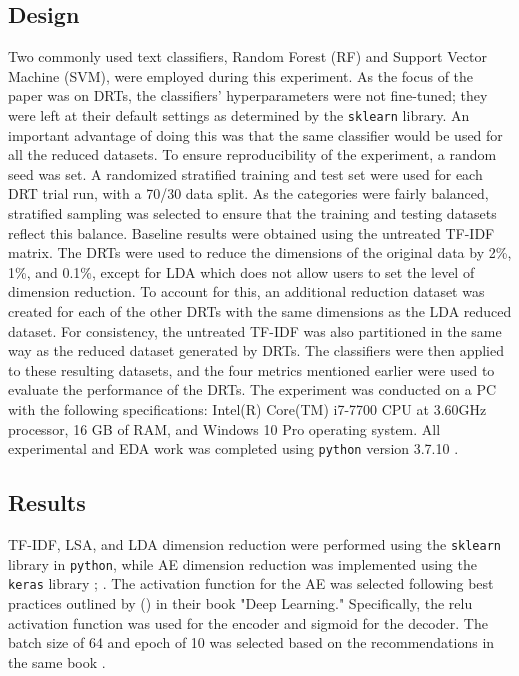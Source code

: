 \documentclass[12pt]{article}
\begin{document}
\subsection{Design}
\hspace{\parindent} Two commonly used text classifiers, Random Forest (RF) and Support Vector Machine (SVM), were employed during this experiment. As the focus of the paper was on DRTs, the classifiers' hyperparameters were not fine-tuned; they were left at their default settings as determined by the \texttt{sklearn} library. An important advantage of doing this was that the same classifier would be used for all the reduced datasets. To ensure reproducibility of the experiment, a random seed was set. A randomized stratified training and test set were used for each DRT trial run, with a 70/30 data split. As the categories were fairly balanced, stratified sampling was selected to ensure that the training and testing datasets reflect this balance. Baseline results were obtained using the untreated TF-IDF matrix. The DRTs were used to reduce the dimensions of the original data by 2\%, 1\%, and 0.1\%, except for LDA which does not allow users to set the level of dimension reduction. To account for this, an additional reduction dataset was created for each of the other DRTs with the same dimensions as the LDA reduced dataset. For consistency, the untreated TF-IDF was also partitioned in the same way as the reduced dataset generated by DRTs. The classifiers were then applied to these resulting datasets, and the four metrics mentioned earlier were used to evaluate the performance of the DRTs. The experiment was conducted on a PC with the following specifications: Intel(R) Core(TM) i7-7700 CPU at 3.60GHz processor, 16 GB of RAM, and Windows 10 Pro operating system. All experimental and EDA work was completed using \texttt{python} version 3.7.10 \parencite{10.5555/1593511}.

\subsection{Results}
\hspace{\parindent} TF-IDF, LSA, and LDA dimension reduction were performed using the \texttt{sklearn} library in \texttt{python}, while AE dimension reduction was implemented using the \texttt{keras} library \parencite{pedregosa2011scikit}; \parencite{chollet2015keras}. The activation function for the AE was selected following best practices outlined by \citeauthor{goodfellow_bengio_courville_2017} (\citeyear{goodfellow_bengio_courville_2017}) in their book "Deep Learning." Specifically, the relu activation function was used for the encoder and sigmoid for the decoder. The batch size of 64 and epoch of 10 was selected based on the recommendations in the same book \parencite{goodfellow_bengio_courville_2017}.
\end{document}
